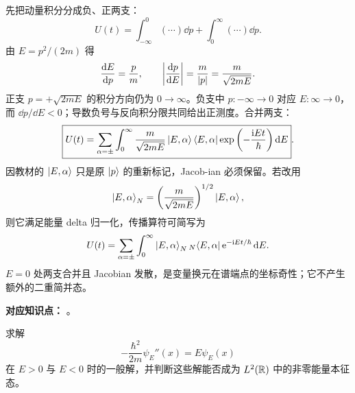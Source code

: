 \begin{checkedsolution}
先把动量积分分成负、正两支：
\begin{equation}
  U(t)=\int_{-\infty}^{0}(\cdots)\dd p
  +\int_0^{\infty}(\cdots)\dd p.
  \label{eq:QM-C05-S01-E01-split}
\end{equation}
由 $E=p^2/(2m)$ 得
\begin{equation}
  \frac{\mathop{}\!\mathrm{d} E}{\mathop{}\!\mathrm{d} p}=\frac{p}{m},
  \qquad
  \left|\frac{\mathop{}\!\mathrm{d} p}{\mathop{}\!\mathrm{d} E}\right|
  =\frac{m}{\left|p\right|}
  =\frac{m}{\sqrt{2mE}}.
  \label{eq:QM-C05-S01-E01-jacobian}
\end{equation}
正支 $p=+\sqrt{2mE}$ 的积分方向仍为 $0\to\infty$。负支中 $p:-\infty\to0$ 对应 $E:\infty\to0$，而 $\dd p/\dd E<0$；导数负号与反向积分限共同给出正测度。合并两支：
\begin{equation}
  \boxed{
  U(t)=\sum_{\alpha=\pm}\int_0^{\infty}
  \frac{m}{\sqrt{2mE}}
  \left|E,\alpha\right\rangle\left\langle E,\alpha\right|
  \exp\left(-\frac{\mathrm{i} Et}{\hbar}\right)\mathop{}\!\mathrm{d} E}.
  \label{eq:QM-C05-S01-E01-energy-propagator}
\end{equation}
因教材的 $\left|E,\alpha\right\rangle$ 只是原 $\left|p\right\rangle$ 的重新标记，Jacob-ian 必须保留。若改用
\begin{equation}
  \left|E,\alpha\right\rangle_{N}
  =\left(\frac{m}{\sqrt{2mE}}\right)^{1/2}
  \left|E,\alpha\right\rangle,
  \label{eq:QM-C05-S01-E01-energy-normalized-ket}
\end{equation}
则它满足能量 delta 归一化，传播算符可简写为
\begin{equation}
  U(t)=\sum_{\alpha=\pm}\int_0^\infty
  \left|E,\alpha\right\rangle_{N}{}_{N}\!\left\langle E,\alpha\right|
  \mathrm{e}^{-\mathrm{i} Et/\hbar}\mathop{}\!\mathrm{d} E.
  \label{eq:QM-C05-S01-E01-normalized-energy-propagator}
\end{equation}
$E=0$ 处两支合并且 Jacobian 发散，是变量换元在谱端点的坐标奇性；它不产生额外的二重简并态。
\end{checkedsolution}


\textbf{对应知识点：}
。

求解
\begin{equation}
  -\frac{\hbar^2}{2m}\psi_E''(x)=E\psi_E(x)
  \label{eq:QM-C05-S01-E02-equation}
\end{equation}
在 $E>0$ 与 $E<0$ 时的一般解，并判断这些解能否成为 $L^2(\mathbb{R})$ 中的非零能量本征态。

